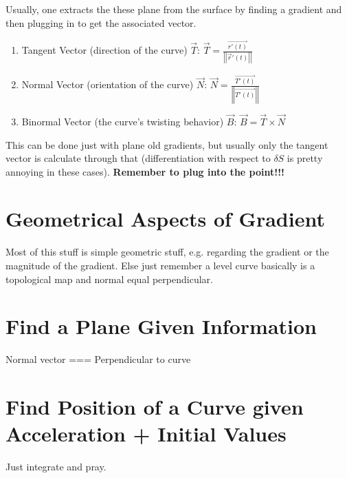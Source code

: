 \documentclass{article}
\begin{document}
Usually, one extracts the these plane from the surface by finding a gradient and then plugging in to get the associated vector.

\begin{enumerate}
    \item Tangent Vector (direction of the curve) $\vec{T}$: $\vec{T} = \frac{\vec{r'(t)}}{\left|\left|\vec{r}'(t)\right|\right|}$
    \item Normal Vector (orientation of the curve) $\vec{N}$: $\vec{N} = \frac{\vec{T'(t)}}{\left|\left|\vec{T'(t)}\right|\right|}$
    \item Binormal Vector (the curve's twisting behavior) $\vec{B}$: $\vec{B} = \vec{T} \times \vec{N}$
\end{enumerate}

This can be done just with plane old gradients, but usually only the tangent vector is calculate through that (differentiation with respect to $\delta S$ is pretty annoying in these cases). \textbf{Remember to plug into the point!!!}

\section{Geometrical Aspects of Gradient}

Most of this stuff is simple geometric stuff, e.g. regarding the gradient or the magnitude of the gradient. Else just remember a level curve basically is a topological map and normal equal perpendicular.

\section{Find a Plane Given Information}

Normal vector === Perpendicular to curve

\section{Find Position of a Curve given Acceleration + Initial Values}

Just integrate and pray. 
\end{document}

